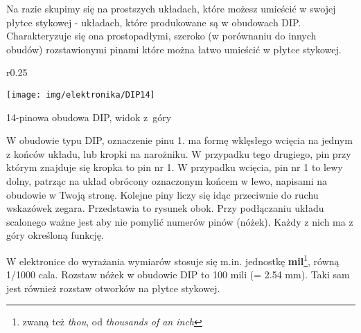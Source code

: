 Na razie skupimy się na prostszych układach, które możesz umieścić w swojej płytce stykowej - układach, które produkowane są w obudowach DIP.
Charakteryzuje się ona prostopadłymi, szeroko (w porównaniu do innych obudów) rozstawionymi pinami które można łatwo umieścić w płytce stykowej.

\begin{wrapfigure}{r}{0.25\textwidth}
  \begin{center}
    \vspace{-20pt}
    \texttt{[image: img/elektronika/DIP14]}
    \vspace{-40pt}
    
    \small{14-pinowa obudowa DIP, widok z~góry}
    \vspace{-33pt}
  \end{center}
\end{wrapfigure}

W obudowie typu DIP, oznaczenie pinu 1. ma formę wklęsłego wcięcia na jednym z końców układu, lub kropki na narożniku. W przypadku tego drugiego, pin przy którym znajduje się kropka to pin nr 1. W przypadku wcięcia, pin nr 1 to lewy dolny, patrząc na układ obrócony oznaczonym końcem w lewo, napisami na obudowie w Twoją stronę. Kolejne piny liczy się idąc przeciwnie do ruchu wskazówek zegara. Przedstawia to rysunek obok.
Przy podłączaniu układu scalonego ważne jest aby nie pomylić numerów pinów (nóżek). Każdy z nich ma z góry określoną funkcję.

\begin{ProTip}{}
  W elektronice do wyrażania wymiarów stosuje się m.in. jednostkę \textbf{mil}\footnote{zwaną też \textit{thou}, od \textit{thousands of an inch}},
  równą 1/1000 cala. Rozstaw nóżek w obudowie DIP to 100 mili (= 2.54 mm). Taki sam jest również rozstaw otworków na płytce stykowej.
\end{ProTip}
